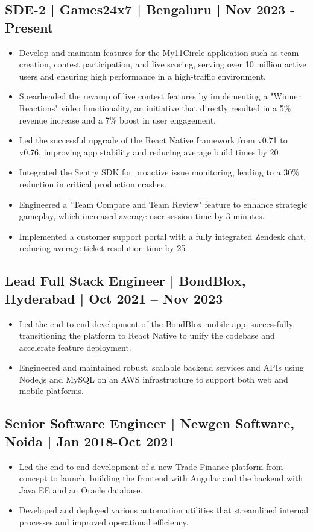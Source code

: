 \documentclass[11pt,a4paper]{article}
\begin{document}
\subsection{SDE-2 | Games24x7 | Bengaluru | Nov 2023 - Present}
\begin{itemize}
\item Develop and maintain features for the My11Circle application such as team creation, contest participation, and live scoring, serving over 10 million active users and ensuring high performance in a high-traffic environment.
\item Spearheaded the revamp of live contest features by implementing a "Winner Reactions" video functionality, an initiative that directly resulted in a 5\% revenue increase and a 7\% boost in user engagement.
\item Led the successful upgrade of the React Native framework from v0.71 to v0.76, improving app stability and reducing average build times by 20%
\item Integrated the Sentry SDK for proactive issue monitoring, leading to a 30\% reduction in critical production crashes.
\item Engineered a "Team Compare and Team Review" feature to enhance strategic gameplay, which increased average user session time by 3 minutes.
\item Implemented a customer support portal with a fully integrated Zendesk chat, reducing average ticket resolution time by 25%
\end{itemize}

\subsection{Lead Full Stack Engineer | BondBlox, Hyderabad | Oct 2021 – Nov 2023}
\begin{itemize}
    \item Led the end-to-end development of the BondBlox mobile app, successfully transitioning the platform to React Native to unify the codebase and accelerate feature deployment.
    \item Engineered and maintained robust, scalable backend services and APIs using Node.js and MySQL on an AWS infrastructure to support both web and mobile platforms.
\end{itemize}

\subsection{Senior Software Engineer | Newgen Software, Noida | Jan 2018-Oct 2021}
\begin{itemize}
    \item Led the end-to-end development of a new Trade Finance platform from concept to launch, building the frontend with Angular and the backend with Java EE and an Oracle database.
    \item Developed and deployed various automation utilities that streamlined internal processes and improved operational efficiency.
\end{itemize}
\end{document}
